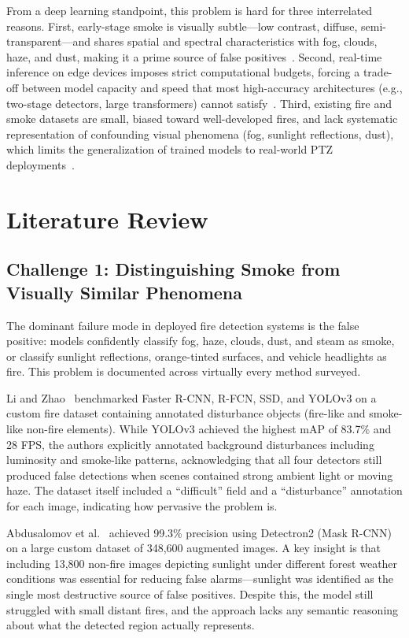 \documentclass[11pt,twocolumn]{article}
\begin{document}
From a deep learning standpoint, this problem is hard for three interrelated reasons. First, early-stage smoke is visually subtle---low contrast, diffuse, semi-transparent---and shares spatial and spectral characteristics with fog, clouds, haze, and dust, making it a prime source of false positives~\cite{spectral_smoke, cnn_vit_smoke}. Second, real-time inference on edge devices imposes strict computational budgets, forcing a trade-off between model capacity and speed that most high-accuracy architectures (e.g., two-stage detectors, large transformers) cannot satisfy~\cite{cnn_fire_detection}. Third, existing fire and smoke datasets are small, biased toward well-developed fires, and lack systematic representation of confounding visual phenomena (fog, sunlight reflections, dust), which limits the generalization of trained models to real-world PTZ deployments~\cite{firematch}.

\section{Literature Review}
\label{sec:litreview}

\subsection{Challenge 1: Distinguishing Smoke from Visually Similar Phenomena}

The dominant failure mode in deployed fire detection systems is the false positive: models confidently classify fog, haze, clouds, dust, and steam as smoke, or classify sunlight reflections, orange-tinted surfaces, and vehicle headlights as fire. This problem is documented across virtually every method surveyed.

Li and Zhao~\cite{cnn_fire_detection} benchmarked Faster R-CNN, R-FCN, SSD, and YOLOv3 on a custom fire dataset containing annotated disturbance objects (fire-like and smoke-like non-fire elements). While YOLOv3 achieved the highest mAP of 83.7\% and 28 FPS, the authors explicitly annotated background disturbances including luminosity and smoke-like patterns, acknowledging that all four detectors still produced false detections when scenes contained strong ambient light or moving haze. The dataset itself included a ``difficult'' field and a ``disturbance'' annotation for each image, indicating how pervasive the problem is.

Abdusalomov et al.~\cite{detectron2fire} achieved 99.3\% precision using Detectron2 (Mask R-CNN) on a large custom dataset of 348,600 augmented images. A key insight is that including 13,800 non-fire images depicting sunlight under different forest weather conditions was essential for reducing false alarms---sunlight was identified as the single most destructive source of false positives. Despite this, the model still struggled with small distant fires, and the approach lacks any semantic reasoning about what the detected region actually represents.
\end{document}
